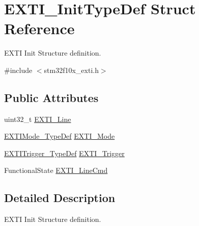 \hypertarget{structEXTI__InitTypeDef}{
\section{EXTI\_\-InitTypeDef Struct Reference}
\label{structEXTI__InitTypeDef}
}


EXTI Init Structure definition.  




{\ttfamily \#include $<$stm32f10x\_\-exti.h$>$}

\subsection*{Public Attributes}
\begin{DoxyCompactItemize}
\item 
uint32\_\-t \hyperlink{structEXTI__InitTypeDef_a1b5bb38e1df331f764b830a1e8ec171f}{EXTI\_\-Line}
\item 
\hyperlink{group__EXTI__Exported__Types_gad5e69af98dc0dfdf64417adc1cf57929}{EXTIMode\_\-TypeDef} \hyperlink{structEXTI__InitTypeDef_a741816862b9cd43cc80781dc89150e7e}{EXTI\_\-Mode}
\item 
\hyperlink{group__EXTI__Exported__Types_ga9da190f5425d1b421a06bced8cc48e9b}{EXTITrigger\_\-TypeDef} \hyperlink{structEXTI__InitTypeDef_ab0bd8417e78fe2b43eed79e44064510c}{EXTI\_\-Trigger}
\item 
FunctionalState \hyperlink{structEXTI__InitTypeDef_ac1769bc5badaef4cffbcf105e3fe1c27}{EXTI\_\-LineCmd}
\end{DoxyCompactItemize}


\subsection{Detailed Description}
EXTI Init Structure definition. 


